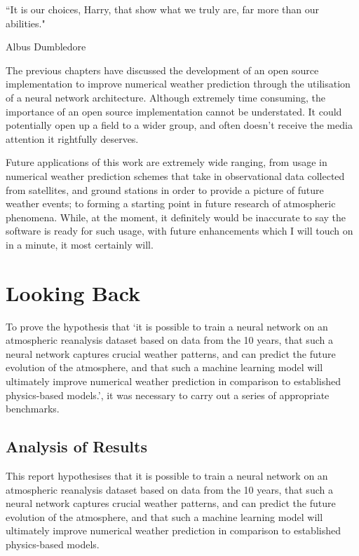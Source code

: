 \epigraph{``It is our choices, Harry, that show what we truly are, far more than our abilities."}{Albus Dumbledore}

The previous chapters have discussed the development of an open source implementation to improve numerical weather prediction through the utilisation of a neural network architecture. Although extremely time consuming, the importance of an open source implementation cannot be understated. It could potentially open up a field to a wider group, and often doesn't receive the media attention it rightfully deserves. 

Future applications of this work are extremely wide ranging, from usage in numerical weather prediction schemes that take in observational data collected from satellites, and ground stations in order to provide a picture of future weather events; to forming a starting point in future research of atmospheric phenomena. While, at the moment, it definitely would be inaccurate to say the software is ready for such usage, with future enhancements which I will touch on in a minute, it most certainly will.

\section{Looking Back}
To prove the hypothesis that `it is possible to train a neural network on an atmospheric reanalysis dataset based on data from the 10 years, that such a neural network captures crucial weather patterns, and can predict the future evolution of the atmosphere, and that such a machine learning model will ultimately improve numerical weather prediction in comparison to established physics-based models.', it was necessary to carry out a series of appropriate benchmarks.

\subsection{Analysis of Results}
This report hypothesises that it is possible to train a neural network on an atmospheric reanalysis dataset based on data from the 10 years, that such a neural network captures crucial weather patterns, and can predict the future evolution of the atmosphere, and that such a machine learning model will ultimately improve numerical weather prediction in comparison to established physics-based models.

